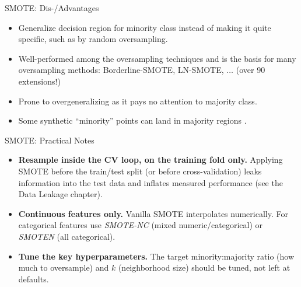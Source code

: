 \documentclass[11pt,compress,t,notes=noshow, xcolor=table]{beamer}
\begin{document}
\begin{frame}{SMOTE: Dis-/Advantages}

    \begin{itemize}
    
        \item Generalize decision region for minority class instead of making it quite specific, such as by random oversampling. 
        
        \item Well-performed among the oversampling techniques and is the basis for many oversampling methods: Borderline-SMOTE, LN-SMOTE, $\ldots$ (over 90 extensions!)
    
        \item Prone to overgeneralizing as it pays no attention to majority class.

        \item Some synthetic ``minority'' points can land in majority regions .

    \end{itemize}		

\end{frame}

\begin{frame}{SMOTE: Practical Notes}
    \begin{itemize}
        \item \textbf{Resample inside the CV loop, on the training fold only.}
        Applying SMOTE before the train/test split (or before cross-validation) leaks
        information into the test data and inflates measured performance
        (see the Data Leakage chapter).

        \item \textbf{Continuous features only.} Vanilla SMOTE interpolates numerically.
        For categorical features use \emph{SMOTE-NC} (mixed numeric/categorical) or
        \emph{SMOTEN} (all categorical).

        \item \textbf{Tune the key hyperparameters.} The target minority:majority ratio
        (how much to oversample) and $k$ (neighborhood size) should be tuned, not left
        at defaults.
    \end{itemize}
\end{frame}
\end{document}

